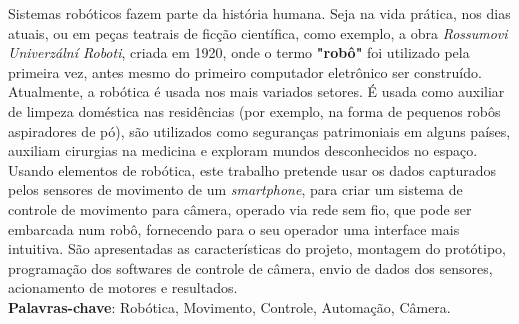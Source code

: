 
\begin{resumo}[RESUMO]
\begin{SingleSpacing}

Sistemas robóticos fazem parte da história humana. Seja na vida prática, nos dias atuais, ou em peças teatrais de ficção científica, como exemplo, a obra \emph{Rossumovi Univerzální Roboti}, criada em 1920, onde o termo \textbf{"robô"} foi utilizado pela primeira vez, antes mesmo do primeiro computador eletrônico ser construído.
Atualmente, a robótica é usada nos mais variados setores. É usada como auxiliar de limpeza doméstica nas residências (por exemplo, na forma de pequenos robôs aspiradores de pó), são utilizados como seguranças patrimoniais em alguns países, auxiliam cirurgias na medicina e exploram mundos desconhecidos no espaço. Usando elementos de robótica, este trabalho pretende usar os dados capturados pelos sensores de movimento de um \textit{smartphone}, para criar um sistema de controle de movimento para câmera, operado via rede sem fio, que pode ser embarcada num robô, fornecendo para o seu operador uma interface mais intuitiva. São apresentadas as características do projeto, montagem do protótipo, programação dos softwares de controle de câmera, envio de dados dos sensores, acionamento de motores e resultados.\\

\textbf{Palavras-chave}: Robótica, Movimento, Controle, Automação, Câmera.

\end{SingleSpacing}
\end{resumo}


